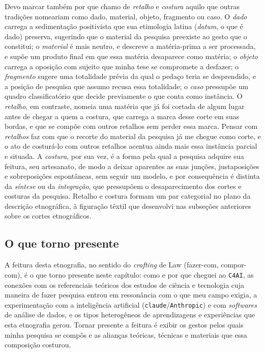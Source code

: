 Devo marcar também por que chamo de \textit{retalho} e \textit{costura} aquilo que outras tradições nomeariam como dado, material, objeto, fragmento ou caso. O \textit{dado} carrega a sedimentação positivista que sua etimologia latina (\textit{datum}, o que é dado) preserva, sugerindo que o material da pesquisa preexiste ao gesto que o constitui; o \textit{material} é mais neutro, e descreve a matéria-prima a ser processada, e supõe um produto final em que essa matéria desaparece como matéria; o \textit{objeto} carrega a oposição com sujeito que minha tese se compromete a desfazer; o \textit{fragmento} sugere uma totalidade prévia da qual o pedaço teria se desprendido, e a posição de pesquisa que assumo recusa essa totalidade; o \textit{caso} pressupõe um quadro classificatório que decide previamente o que conta como instância. O \textit{retalho}, em contraste, nomeia uma matéria que já foi cortada de algum lugar antes de chegar a quem a costura, que carrega a marca desse corte em suas bordas, e que se compõe com outros retalhos sem perder essa marca. Pensar com \textit{retalhos} faz com que o recorte do material da pesquisa já me chegue como corte, e o ato de costurá-lo com outros retalhos acentua ainda mais essa instância parcial e situada. A \textit{costura}, por sua vez, é a forma pela qual a pesquisa adquire sua feitura, seu artesanato, de modo a deixar aparentes as suas junções, justaposições e sobreposições espontâneas, sem seguir um modelo, e por consequência é distinta da \textit{síntese} ou da \textit{integração}, que pressupõem o desaparecimento dos cortes e costuras da pesquisa. Retalho e costura formam um par categorial no plano da descrição etnográfica, à figuração têxtil que desenvolvi nas subseções anteriores sobre os cortes etnográficos.

\subsection{O que torno presente}

A feitura desta etnografia, no sentido do \textit{crafting} de Law (fazer-com, compor-com), é o que torno presente neste capítulo: como e por que cheguei ao \texttt{C4AI}, as conexões com os referenciais teóricos dos estudos de ciência e tecnologia cuja maneira de fazer pesquisa entrou em ressonância com o que meu campo exigia, a experimentação com a inteligência artificial (\texttt{claude}/\texttt{Anthropic}) e com \textit{softwares} de análise de dados, e os tipos heterogêneos de aprendizagens e experiências que esta etnografia gerou. Tornar presente a feitura é exibir os gestos pelos quais minha pesquisa se compôs e as alianças teóricas, técnicas e materiais que essa composição costurou.


